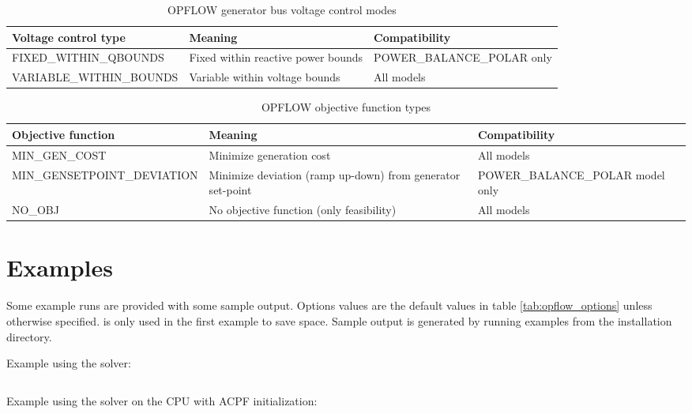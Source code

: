 \begin{table}[H]
  \centering
  \caption{OPFLOW generator bus voltage control modes}
  \begin{tabular}{|p{}|p{}|p{}|}
    \hline
    \textbf{Voltage control type} & \textbf{Meaning} & \textbf{Compatibility}\\ \hline
    FIXED\_WITHIN\_QBOUNDS & Fixed within reactive power bounds & POWER\_BALANCE\_POLAR only \\ \hline
    VARIABLE\_WITHIN\_BOUNDS & Variable within voltage bounds & All models \\ \hline
  \end{tabular}
\label{tab:opflow_genbusvoltage}
\end{table}

\begin{table}[H]
  \centering
  \caption{OPFLOW objective function types}
  \begin{tabular}{|p{}|p{}|p{}|}
    \hline
    \textbf{Objective function} & \textbf{Meaning} & \textbf{Compatibility}\\ \hline
    MIN\_GEN\_COST & Minimize generation cost & All models \\ \hline
    MIN\_GENSETPOINT\_DEVIATION & Minimize deviation (ramp up-down) from generator set-point & POWER\_BALANCE\_POLAR model only\\ \hline
    NO\_OBJ & No objective function (only feasibility) & All models \\ \hline
  \end{tabular}
\label{tab:opflow_objtypes}
\end{table}


\section{Examples}

Some \opflow example runs are provided with some sample output. Options values are the default values in table \ref{tab:opflow_options} unless otherwise specified.  is only used in the first example to save space. Sample output is generated by running examples from the installation directory.

Example using the \ipopt solver:

\begin{lstlisting}

\end{lstlisting}

Example using the \hiop solver on the CPU with ACPF initialization:

\begin{lstlisting}

\end{lstlisting}
